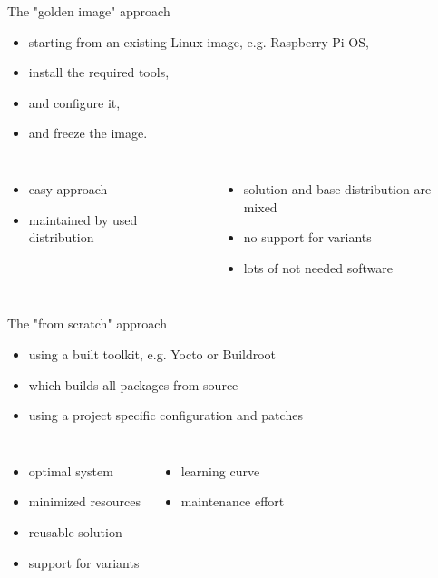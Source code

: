 \documentclass{beamer}
\newcommand\pro{\item[$+$]}
\newcommand\con{\item[$-$]}
\begin{document}
\begin{frame}{The "golden image" approach}
	\begin{itemize}
		\item starting from an existing Linux image, e.g. Raspberry Pi OS,
		\item install the required tools,
		\item and configure it,
		\item and freeze the image.
	\end{itemize}

	\begin{columns}[t]
        \centering
        \begin{itemize}
			\pro easy approach
			\pro maintained by used distribution
		\end{itemize}        
        \centering
        \begin{itemize}
        		\con solution and base distribution are mixed
        		\con no support for variants
        		\con lots of not needed software
        \end{itemize}
    \end{columns}
\end{frame}

\begin{frame}{The "from scratch" approach}
	\begin{itemize}
		\item using a built toolkit, e.g. Yocto or Buildroot
		\item which builds all packages from source
		\item using a project specific configuration and patches
	\end{itemize}

	\begin{columns}[t]
        \centering
        \begin{itemize}
        	\pro optimal system
        	\pro minimized resources
        	\pro reusable solution
        	\pro support for variants
        \end{itemize}
        \centering
        \begin{itemize}
        		\con learning curve
        		\con maintenance effort
        \end{itemize}
    \end{columns}
\end{frame}
\end{document}
